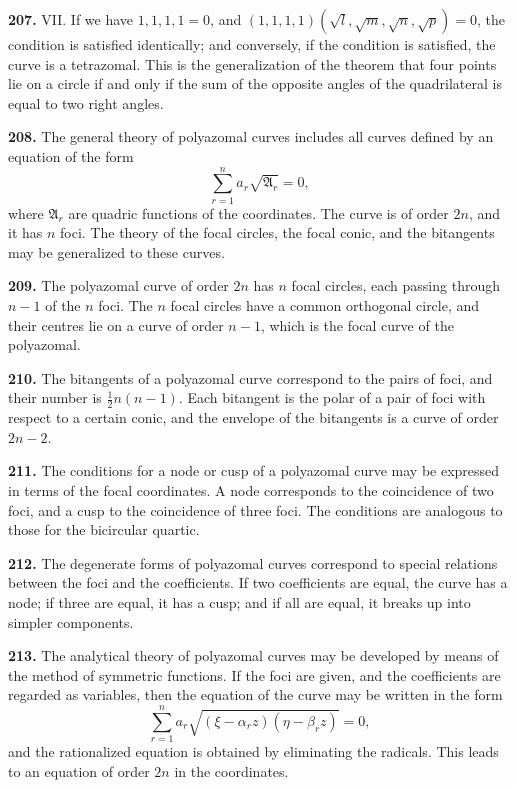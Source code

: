 \documentclass[12pt,a4paper]{article}
\theoremstyle{definition}
\begin{document}
\noindent\textbf{207.} VII. If we have $1, 1, 1, 1 = 0$, and $(1, 1, 1, 1)(\sqrt{l}, \sqrt{m}, \sqrt{n}, \sqrt{p}) = 0$,
the condition is satisfied identically; and conversely, if the condition is satisfied, the
curve is a tetrazomal. This is the generalization of the theorem that four points lie
on a circle if and only if the sum of the opposite angles of the quadrilateral is equal
to two right angles.

\newpage
\noindent\textbf{208.} The general theory of polyazomal curves includes all curves defined by
an equation of the form
\[
\sum_{r=1}^{n} a_r\sqrt{\mathfrak{A}_r} = 0,
\]
where $\mathfrak{A}_r$ are quadric functions of the coordinates. The curve is of order $2n$, and it has
$n$ foci. The theory of the focal circles, the focal conic, and the bitangents may be
generalized to these curves.

\noindent\textbf{209.} The polyazomal curve of order $2n$ has $n$ focal circles, each passing through
$n-1$ of the $n$ foci. The $n$ focal circles have a common orthogonal circle, and their
centres lie on a curve of order $n-1$, which is the focal curve of the polyazomal.

\noindent\textbf{210.} The bitangents of a polyazomal curve correspond to the pairs of foci,
and their number is $\frac{1}{2}n(n-1)$. Each bitangent is the polar of a pair of foci with
respect to a certain conic, and the envelope of the bitangents is a curve of order $2n-2$.

\noindent\textbf{211.} The conditions for a node or cusp of a polyazomal curve may be
expressed in terms of the focal coordinates. A node corresponds to the coincidence of
two foci, and a cusp to the coincidence of three foci. The conditions are analogous to
those for the bicircular quartic.

\noindent\textbf{212.} The degenerate forms of polyazomal curves correspond to special relations
between the foci and the coefficients. If two coefficients are equal, the curve has a
node; if three are equal, it has a cusp; and if all are equal, it breaks up into simpler
components.

\newpage
\noindent\textbf{213.} The analytical theory of polyazomal curves may be developed by means
of the method of symmetric functions. If the foci are given, and the coefficients are
regarded as variables, then the equation of the curve may be written in the form
\[
\sum_{r=1}^{n} a_r\sqrt{(\xi - \alpha_r z)(\eta - \beta_r z)} = 0,
\]
and the rationalized equation is obtained by eliminating the radicals. This leads to an
equation of order $2n$ in the coordinates.
\end{document}
